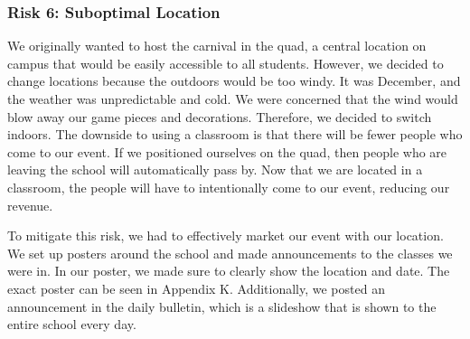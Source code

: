 \subsubsection{Risk 6: Suboptimal Location}

We originally wanted to host the carnival in the quad, a central location on campus that would be easily accessible to all students. However, we decided to change locations because the outdoors would be too windy. It was December, and the weather was unpredictable and cold. We were concerned that the wind would blow away our game pieces and decorations. Therefore, we decided to switch indoors. The downside to using a classroom is that there will be fewer people who come to our event. If we positioned ourselves on the quad, then people who are leaving the school will automatically pass by. Now that we are located in a classroom, the people will have to intentionally come to our event, reducing our revenue.

To mitigate this risk, we had to effectively market our event with our location. We set up posters around the school and made announcements to the classes we were in. In our poster, we made sure to clearly show the location and date. The exact poster can be seen in Appendix K. Additionally, we posted an announcement in the daily bulletin, which is a slideshow that is shown to the entire school every day.
